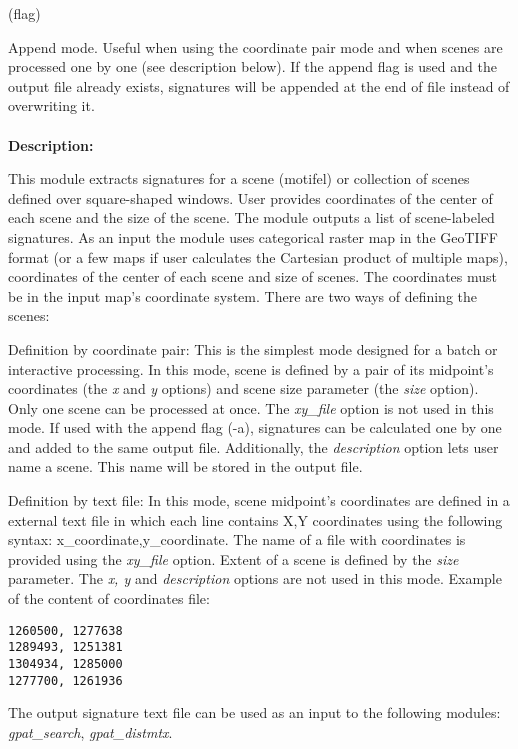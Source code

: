  (flag)

Append mode. 
Useful when using the coordinate pair mode and when scenes are processed one by one (see description below). 
If the append flag is used and the output file already exists, signatures will be appended at the end of file instead of overwriting it.
\\\\
{\bf Description:}

This module extracts signatures for a scene (motifel) or collection of scenes defined over square-shaped windows.
User provides coordinates of the center of each scene and the size of the scene. 
The module outputs a list of scene-labeled signatures.
As an input the module uses categorical raster map in the GeoTIFF format (or a few maps if user calculates the Cartesian product of multiple maps), coordinates of the center of each scene and size of scenes. 
The coordinates must be in the input map's coordinate system. 
There are two ways of defining the scenes:

Definition by coordinate pair: 
This is the simplest mode designed for a batch or interactive processing. 
In this mode, scene is defined by a pair of its midpoint's coordinates (the {\it x} and {\it y} options) and scene size parameter (the {\it size} option). 
Only one scene can be processed at once. 
The {\it xy\_file} option is not used in this mode.
If used with the append flag (-a), signatures can be calculated one by one and added to the same output file. 
Additionally, the {\it description} option lets user name a scene. 
This name will be stored in the output file.

Definition by text file:
In this mode, scene midpoint's coordinates are defined in a external text file in which each line contains X,Y coordinates using the following syntax: x\_coordinate,y\_coordinate.
The name of a file with coordinates is provided using the {\it xy\_file} option. 
Extent of a scene is defined by the {\it size} parameter. 
The {\it x, y} and {\it description} options are not used in this mode. 
Example of the content of coordinates file: 

\begin{minipage}{\linewidth}
\begin{lstlisting}
1260500, 1277638
1289493, 1251381
1304934, 1285000
1277700, 1261936
\end{lstlisting}
\end{minipage}

The output signature text file can be used as an input to the following modules: {\it gpat\_search}, {\it gpat\_distmtx}.

